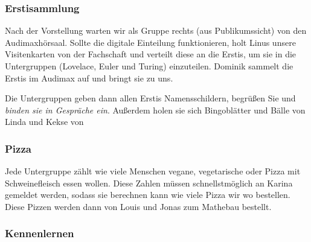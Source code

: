 \documentclass[10pt,twocolumn,ngerman]{scrartcl}
\begin{document}
\subsubsection{Erstisammlung}

Nach der Vorstellung warten wir als Gruppe rechts (aus Publikumssicht) von den
Audimaxhörsaal. Sollte die digitale Einteilung funktionieren, holt Linus unsere
Visitenkarten von der Fachschaft und verteilt diese an die Erstis, um sie in
die Untergruppen (Lovelace, Euler und Turing) einzuteilen. Dominik sammelt die
Erstis im Audimax auf und bringt sie zu uns. 

Die Untergruppen geben dann allen Erstis Namensschildern, begrüßen Sie und
\emph{binden sie in Gespräche ein}. Außerdem holen sie sich Bingoblätter und Bälle von Linda und Kekse von 

\subsubsection{Pizza}

Jede Untergruppe zählt wie viele Menschen vegane, vegetarische oder Pizza mit
Schweinefleisch essen wollen. Diese Zahlen müssen schnellstmöglich an Karina
gemeldet werden, sodass sie berechnen kann wie viele Pizza wir wo bestellen.
Diese Pizzen werden dann von Louis und Jonas zum Mathebau bestellt.



\subsubsection{Kennenlernen}
\end{document}

